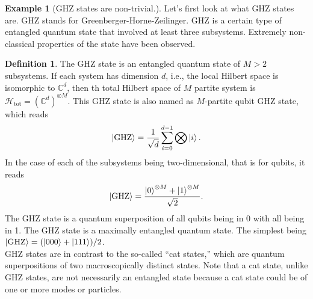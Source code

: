 \documentclass{book}
\theoremstyle{definition}
\newtheorem{defn}{Definition}[section]
\newtheorem{exmp}{Example}[section]
\newcommand{\had}{\mathcal{H}}
\newcommand{\f}[2]{\frac{#1}{#2}}
\begin{document}
\begin{exmp}[GHZ states are non-trivial.] 
	Let's first look at what GHZ states are. GHZ stands for Greenberger-Horne-Zeilinger. GHZ is a certain type of entangled quantum state that involved at least three subsystems. Extremely non-classical properties of the state have been observed. \\
	
	\begin{defn}
		The GHZ state is an entangled quantum state of $M>2$ subsystems. If each system has dimension $d$, i.e., the local Hilbert space is isomorphic to $\mathbb{C}^d$, then th total Hilbert space of $M$ partite system is $\had_\text{tot} = (\mathbb{C}^d)^{\otimes M}$. This GHZ state is also named as $M$-partite qubit GHZ state, which reads
		\begin{align}
		\ket{\text{GHZ}} = \f{1}{\sqrt{d}}\sum^{d-1}_{i=0}\bigotimes \ket{i}.
		\end{align}
		In the case of each of the subsystems being two-dimensional, that is for qubits, it reads
		\begin{align}
		\ket{\text{GHZ}} = \f{\ket{0}^{\otimes M} + \ket{1}^{\otimes M}}{\sqrt{2}}.
		\end{align}
		The GHZ state is a quantum superposition of all qubits being in 0 with all being in 1. The GHZ state is a maximally entangled quantum state. The simplest being $\ket{\text{GHZ}} = (\ket{000} + \ket{111})/2$.\\
		
		GHZ states are in contrast to the so-called ``cat states,'' which are quantum superpositions of two macroscopically distinct states. Note that a cat state, unlike GHZ states, are not necessarily an entangled state because a cat state could be of one or more modes or particles. 
	\end{defn}
	
	
	

\end{exmp}
\end{document}
